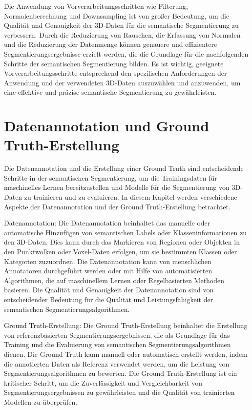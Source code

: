 Die Anwendung von Vorverarbeitungsschritten wie Filterung, Normalenberechnung
und Downsampling ist von großer Bedeutung, um die Qualität und Genauigkeit der
3D-Daten für die semantische Segmentierung zu verbessern. Durch die Reduzierung
von Rauschen, die Erfassung von Normalen und die Reduzierung der Datenmenge
können genauere und effizientere Segmentierungsergebnisse erzielt werden, die
die Grundlage für die nachfolgenden Schritte der semantischen Segmentierung
bilden. Es ist wichtig, geeignete Vorverarbeitungsschritte entsprechend den
spezifischen Anforderungen der Anwendung und der verwendeten 3D-Daten
auszuwählen und anzuwenden, um eine effektive und präzise semantische
Segmentierung zu gewährleisten.

\section{Datenannotation und Ground Truth-Erstellung}

Die Datenannotation und die Erstellung einer Ground Truth sind entscheidende
Schritte in der semantischen Segmentierung, um die Trainingsdaten für
maschinelles Lernen bereitzustellen und Modelle für die Segmentierung von
3D-Daten zu trainieren und zu evaluieren. In diesem Kapitel werden verschiedene
Aspekte der Datenannotation und der Ground Truth-Erstellung betrachtet.

Datenannotation: Die Datenannotation beinhaltet das manuelle oder automatische
Hinzufügen von semantischen Labels oder Klasseninformationen zu den 3D-Daten.
Dies kann durch das Markieren von Regionen oder Objekten in den Punktwolken
oder Voxel-Daten erfolgen, um sie bestimmten Klassen oder Kategorien
zuzuordnen. Die Datenannotation kann von menschlichen Annotatoren durchgeführt
werden oder mit Hilfe von automatisierten Algorithmen, die auf maschinellem
Lernen oder Regelbasierten Methoden basieren. Die Qualität und Genauigkeit der
Datenannotation sind von entscheidender Bedeutung für die Qualität und
Leistungsfähigkeit der semantischen Segmentierungsalgorithmen.

Ground Truth-Erstellung: Die Ground Truth-Erstellung beinhaltet die Erstellung
von referenzbasierten Segmentierungsergebnissen, die als Grundlage für das
Training und die Evaluierung von semantischen Segmentierungsalgorithmen dienen.
Die Ground Truth kann manuell oder automatisch erstellt werden, indem die
annotierten Daten als Referenz verwendet werden, um die Leistung von
Segmentierungsalgorithmen zu bewerten. Die Ground Truth-Erstellung ist ein
kritischer Schritt, um die Zuverlässigkeit und Vergleichbarkeit von
Segmentierungsergebnissen zu gewährleisten und die Qualität von trainierten
Modellen zu überprüfen.

